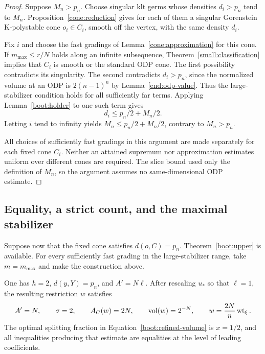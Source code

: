 \begin{proof}
Suppose $M_n>p_n$.  Choose singular klt germs whose densities
$d_i>p_n$ tend to $M_n$.  Proposition~\ref{cone:reduction}
gives for each of them a singular Gorenstein K-polystable cone
$o_i\in C_i$, smooth off the vertex, with the same density
$d_i$.

Fix $i$ and choose the fast gradings of
Lemma~\ref{cone:approximation} for this cone.  If
$m_{\max}\leq r/N$ holds along an infinite subsequence,
Theorem~\ref{small:classification} implies that $C_i$ is
smooth or the standard ODP cone.  The first possibility
contradicts its singularity.  The second contradicts
$d_i>p_n$, since the normalized volume at an ODP is
$2(n-1)^n$ by Lemma~\ref{end:odp-value}.
Thus the large-stabilizer condition holds for all sufficiently
far terms.  Applying Lemma~\ref{boot:holder} to one such
term gives
\[
 d_i\leq p_n/2+M_n/2.
\]
Letting $i$ tend to infinity yields
$M_n\leq p_n/2+M_n/2$, contrary to $M_n>p_n$.

All choices of sufficiently fast gradings in this argument
are made separately for each fixed cone $C_i$.  Neither an
attained supremum nor approximation estimates uniform over
different cones are required.  The slice bound used only
the definition of $M_n$, so the argument assumes no
same-dimensional ODP estimate.
\end{proof}

\subsection{Equality, a strict count, and the maximal stabilizer}

Suppose now that the fixed cone satisfies $d(o,C)=p_n$.
Theorem~\ref{boot:upper} is available.  For every
sufficiently fast grading in the large-stabilizer range,
take $m=m_{\max}$ and make the construction above.

\begin{lemma}
\label{boot:equality-data}
One has $h=2$, $d(y,Y)=p_n$, and $A'=N\ell$.
After rescaling $u_*$ so that $\ell=1$, the resulting
restriction $w$ satisfies
\begin{equation}
 \label{boot:equality-identities}
 A'=N,
 \qquad \sigma=2,
 \qquad A_C(w)=2N,
 \qquad \operatorname{vol}(w)=2^{-N},
 \qquad w=\frac{2N}{n}\operatorname{wt}_\xi.
\end{equation}
The optimal splitting fraction in
Equation~\eqref{boot:refined-volume} is $x=1/2$, and all
inequalities producing that estimate are equalities at the
level of leading coefficients.
\end{lemma}

